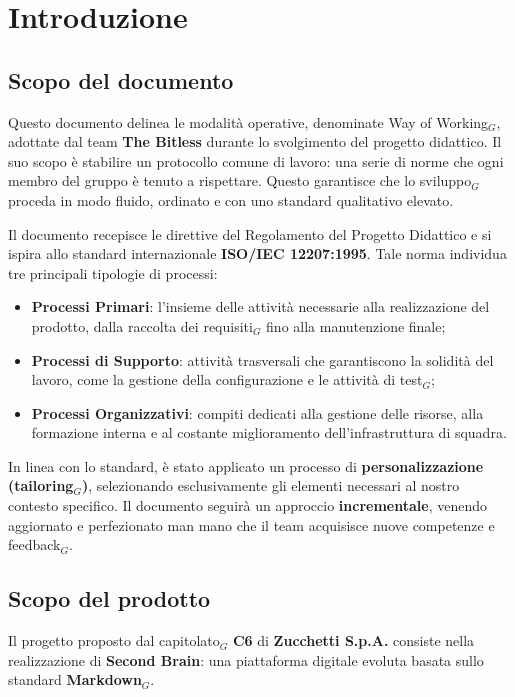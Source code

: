 \documentclass[a4paper, 10pt]{article}
\begin{document}
\newpage
\tableofcontents 

\newpage

\section{Introduzione}

\subsection{Scopo del documento}
Questo documento delinea le modalità operative, denominate Way of Working$_G$, adottate dal team \textbf{The Bitless} durante lo svolgimento del progetto didattico. Il suo scopo è stabilire un protocollo comune di lavoro: una serie di norme che ogni membro del gruppo è tenuto a rispettare. Questo garantisce che lo sviluppo$_G$ proceda in modo fluido, ordinato e con uno standard qualitativo elevato.

Il documento recepisce le direttive del Regolamento del Progetto Didattico e si ispira allo standard internazionale \textbf{ISO/IEC 12207:1995}. Tale norma individua tre principali tipologie di processi:
\begin{itemize}
    \item \textbf{Processi Primari}: l'insieme delle attività necessarie alla realizzazione del prodotto, dalla raccolta dei requisiti$_G$ fino alla manutenzione finale;
    \item \textbf{Processi di Supporto}: attività trasversali che garantiscono la solidità del lavoro, come la gestione della configurazione e le attività di test$_G$;
    \item \textbf{Processi Organizzativi}: compiti dedicati alla gestione delle risorse, alla formazione interna e al costante miglioramento dell'infrastruttura di squadra.
\end{itemize}

In linea con lo standard, è stato applicato un processo di \textbf{personalizzazione (tailoring$_G$)}, selezionando esclusivamente gli elementi necessari al nostro contesto specifico. Il documento seguirà un approccio \textbf{incrementale}, venendo aggiornato e perfezionato man mano che il team acquisisce nuove competenze e feedback$_G$.

\subsection{Scopo del prodotto}

Il progetto proposto dal capitolato$_G$ \textbf{C6} di \textbf{Zucchetti S.p.A.} consiste nella realizzazione di \textbf{Second Brain}: una piattaforma digitale evoluta basata sullo standard \textbf{Markdown$_G$}.
\end{document}
